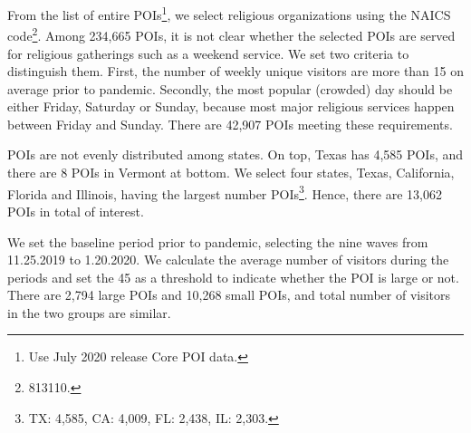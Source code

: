 \documentclass[12pt,english]{article}
\begin{document}
	
	From the list of entire POIs\footnote{Use July 2020 release Core POI data.}, we select religious organizations using the NAICS code\footnote{813110.}. Among 234,665 POIs, it is not clear whether the selected POIs are served for religious gatherings such as a weekend service. We set two criteria to distinguish them. First, the number of weekly unique visitors are more than 15 on average prior to pandemic. Secondly, the most popular (crowded) day should be either Friday, Saturday or Sunday, because most major religious services happen between Friday and Sunday. There are 42,907 POIs meeting these requirements.  
	
	POIs are not evenly distributed among states.  On top, Texas has 4,585 POIs, and there are 8 POIs in Vermont at bottom. We select four states, Texas, California, Florida and Illinois, having the largest number POIs\footnote{TX: 4,585, CA: 4,009, FL: 2,438, IL: 2,303.}. Hence, there are 13,062 POIs in total of interest.
	
	We set the baseline period prior to pandemic, selecting the nine waves from 11.25.2019 to 1.20.2020. We calculate the average number of visitors during the periods and set the 45 as a threshold to indicate whether the POI is large or not. There are 2,794 large POIs and 10,268 small POIs, and total number of visitors in the two groups are similar. 
\end{document}
